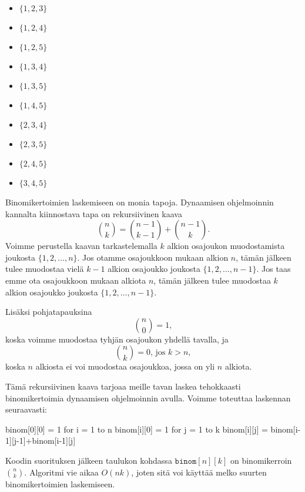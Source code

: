 \begin{multicols}{3}
\begin{itemize}
\item $\{1,2,3\}$
\item $\{1,2,4\}$
\item $\{1,2,5\}$
\item $\{1,3,4\}$
\item $\{1,3,5\}$
\item $\{1,4,5\}$
\item $\{2,3,4\}$
\item $\{2,3,5\}$
\item $\{2,4,5\}$
\item $\{3,4,5\}$
\end{itemize}
\end{multicols}

Binomikertoimien laskemiseen on monia tapoja.
Dynaamisen ohjelmoinnin kannalta kiinnostava tapa on rekursiivinen kaava
\[\binom{n}{k} = \binom{n-1}{k-1} + \binom{n-1}{k}.\]
Voimme perustella kaavan tarkastelemalla
$k$ alkion osajoukon muodostamista joukosta $\{1,2,\dots,n\}$.
Jos otamme osajoukkoon mukaan alkion $n$, tämän jälkeen tulee muodostaa
vielä $k-1$ alkion osajoukko joukosta $\{1,2,\dots,n-1\}$.
Jos taas emme ota osajoukkoon mukaan alkiota $n$, tämän jälkeen tulee muodostaa
$k$ alkion osajoukko joukosta $\{1,2,\dots,n-1\}$.

Lisäksi pohjatapauksina
\[ \binom{n}{0} = 1,\]
koska voimme muodostaa tyhjän osajoukon yhdellä tavalla, ja
\[ \binom{n}{k} = 0,\,\textrm{jos $k>n$},\]
koska $n$ alkiosta ei voi muodostaa osajoukkoa, jossa on yli $n$ alkiota.

Tämä rekursiivinen kaava tarjoaa meille tavan laskea tehokkaasti
binomikertoimia dynaamisen ohjelmoinnin avulla.
Voimme toteuttaa laskennan seuraavasti:

\begin{code}
binom[0][0] = 1
for i = 1 to n
    binom[i][0] = 1
    for j = 1 to k
        binom[i][j] = binom[i-1][j-1]+binom[i-1][j]
\end{code}

Koodin suorituksen jälkeen taulukon kohdassa
$\texttt{binom}[n][k]$ on binomikerroin $\binom{n}{k}$.
Algoritmi vie aikaa $O(nk)$, joten sitä voi käyttää
melko suurten binomikertoimien laskemiseen.
